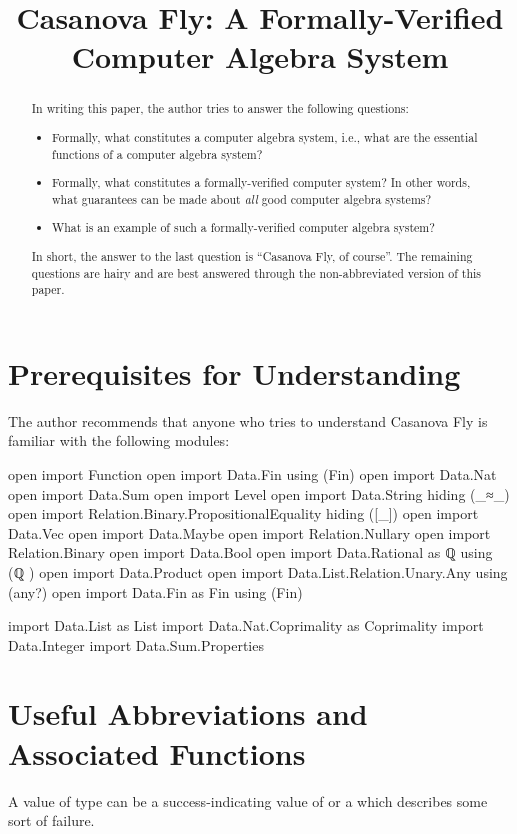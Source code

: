 \documentclass{report}
\title{Casanova Fly: A Formally-Verified Computer Algebra System}
\begin{document}
\maketitle{}

\begin{abstract}
In writing this paper, the author tries to answer the following questions:

\begin{itemize}
  \item Formally, what constitutes a computer algebra system, i.e., what are the essential functions of a computer algebra system?
  \item Formally, what constitutes a formally-verified computer system?  In other words, what guarantees can be made about \emph{all} good computer algebra systems?
  \item What is an example of such a formally-verified computer algebra system?
\end{itemize}

In short, the answer to the last question is ``Casanova Fly, of course''.  The remaining questions are hairy and are best answered through the non-abbreviated version of this paper.
\end{abstract}

\chapter{Prerequisites for Understanding}
The author recommends that anyone who tries to understand Casanova Fly is familiar with the following modules:

\begin{code}
open import Function
open import Data.Fin using (Fin)
open import Data.Nat
open import Data.Sum
open import Level
open import Data.String hiding (_≈_)
open import Relation.Binary.PropositionalEquality hiding ([_])
open import Data.Vec
open import Data.Maybe
open import Relation.Nullary
open import Relation.Binary
open import Data.Bool
open import Data.Rational
  as ℚ
  using (ℚ
        )
open import Data.Product
open import Data.List.Relation.Unary.Any using (any?)
open import Data.Fin as Fin using (Fin)

import Data.List as List
import Data.Nat.Coprimality as Coprimality
import Data.Integer
import Data.Sum.Properties
\end{code}

\chapter{Useful Abbreviations and Associated Functions}
A value of type   can be a success-indicating value of  or a  which describes some sort of failure.
\end{document}

